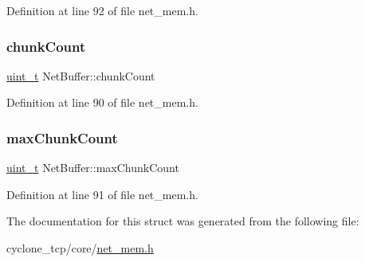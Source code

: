 Definition at line 92 of file net\+\_\+mem.\+h.

\mbox{\label{structNetBuffer_a43ab1f87d0236d4e01c19ff14f899618}} 
\subsubsection{\texorpdfstring{chunk\+Count}{chunkCount}}
{\footnotesize\ttfamily \hyperlink{compiler__port_8h_a12a1e9b3ce141648783a82445d02b58d}{uint\+\_\+t} Net\+Buffer\+::chunk\+Count}



Definition at line 90 of file net\+\_\+mem.\+h.

\mbox{\label{structNetBuffer_a6c71e1c9f8122aa63841d14b2a426734}} 
\subsubsection{\texorpdfstring{max\+Chunk\+Count}{maxChunkCount}}
{\footnotesize\ttfamily \hyperlink{compiler__port_8h_a12a1e9b3ce141648783a82445d02b58d}{uint\+\_\+t} Net\+Buffer\+::max\+Chunk\+Count}



Definition at line 91 of file net\+\_\+mem.\+h.



The documentation for this struct was generated from the following file\+:\begin{DoxyCompactItemize}
\item 
cyclone\+\_\+tcp/core/\hyperlink{net__mem_8h}{net\+\_\+mem.\+h}\end{DoxyCompactItemize}
